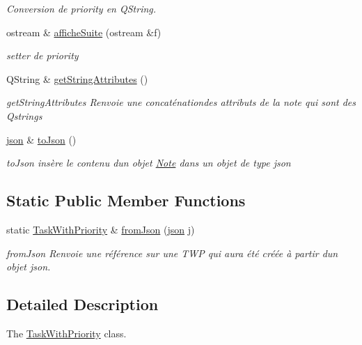 \begin{DoxyCompactItemize}
\begin{DoxyCompactList}\small\item\em Conversion de priority en Q\+String. \end{DoxyCompactList}\item 
ostream \& \hyperlink{classTaskWithPriority_abba0d3458bd4ef1aed57ddd0d0cbe233}{affiche\+Suite} (ostream \&f)
\begin{DoxyCompactList}\small\item\em setter de priority \end{DoxyCompactList}\item 
Q\+String \& \hyperlink{classTaskWithPriority_a8463ac90713f33e4e9ca04de18eebb8b}{get\+String\+Attributes} ()
\begin{DoxyCompactList}\small\item\em get\+String\+Attributes Renvoie une concaténationdes attributs de la note qui sont des Qstrings \end{DoxyCompactList}\item 
\hyperlink{classnlohmann_1_1basic__json}{json} \& \hyperlink{classTaskWithPriority_adeda4ce31e96224993db991c60fccbc7}{to\+Json} ()
\begin{DoxyCompactList}\small\item\em to\+Json insère le contenu d\textquotesingle{}un objet \hyperlink{classNote}{Note} dans un objet de type json \end{DoxyCompactList}\end{DoxyCompactItemize}
\subsection*{Static Public Member Functions}
\begin{DoxyCompactItemize}
\item 
static \hyperlink{classTaskWithPriority}{Task\+With\+Priority} \& \hyperlink{classTaskWithPriority_ad198d3bb6af6f3e7e10518cabc08bf1f}{from\+Json} (\hyperlink{classnlohmann_1_1basic__json}{json} j)
\begin{DoxyCompactList}\small\item\em from\+Json Renvoie une référence sur une T\+WP qui aura été créée à partir d\textquotesingle{}un objet json. \end{DoxyCompactList}\end{DoxyCompactItemize}


\subsection{Detailed Description}
The \hyperlink{classTaskWithPriority}{Task\+With\+Priority} class. 

